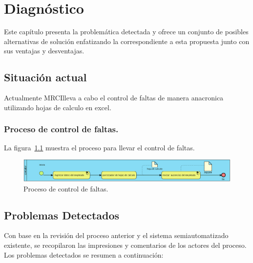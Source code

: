 \documentclass[10pt]{book}
\newcommand{\cliente}{MRCI}
\begin{document}
\chapter{Diagnóstico} 

	Este capítulo presenta la problemática detectada y ofrece un conjunto de posibles alternativas de solución enfatizando la correspondiente a esta propuesta junto con sus ventajas y desventajas.
	
\section{Situación actual}

	Actualmente \cliente lleva a cabo el control de faltas de manera anacronica utilizando hojas de calculo en excel.
	
\subsection{Proceso de control de faltas.}

	La figura~\ref{fig:procesoLic} muestra el proceso para llevar el control de faltas.

\begin{figure}[htbp!]
	\begin{center}
		\includegraphics[width=\textwidth]{images/procesoLic}
		\caption{Proceso de control de faltas.}
		\label{fig:procesoLic}
	\end{center}
\end{figure}


\section{Problemas Detectados}
	
	Con base en la revisión del proceso anterior y el sistema semiautomatizado existente, se recopilaron las impresiones y comentarios de los actores del proceso. Los problemas detectados se resumen a continuación:
	
\end{document}
